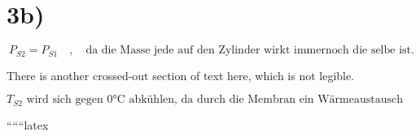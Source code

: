 

\section*{3b)}

\[
P_{S2} = P_{S1} \quad , \quad \text{da die Masse jede auf den Zylinder wirkt immernoch die selbe ist.}
\]

\noindent
There is another crossed-out section of text here, which is not legible.

\[
T_{S2} \text{ wird sich gegen 0°C abkühlen, da durch die Membran ein Wärmeaustausch stattfindet.}
\]

``````latex